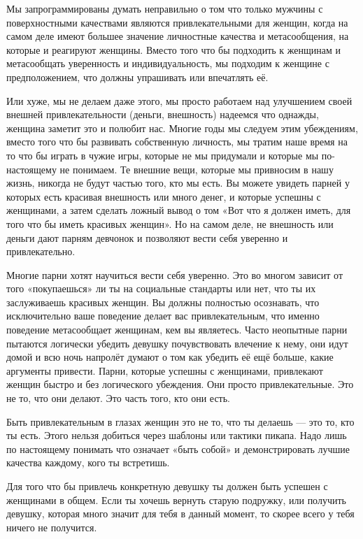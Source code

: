 Мы запрограммированы думать неправильно о том что только мужчины с поверхностными качествами являются привлекательными для женщин, когда на самом деле имеют большее значение личностные качества и метасообщения, на которые и реагируют женщины. Вместо того что бы подходить к женщинам и метасообщать уверенность и индивидуальность, мы подходим к женщине с предположением, что должны упрашивать или впечатлять её.

Или хуже, мы не делаем даже этого, мы просто работаем над улучшением своей внешней привлекательности (деньги, внешность) надеемся что однажды, женщина заметит это и полюбит нас. Многие годы мы следуем этим убеждениям, вместо того что бы развивать собственную личность, мы тратим наше время на то что бы играть в чужие игры, которые не мы придумали и которые мы по-настоящему не понимаем. Те внешние вещи, которые мы привносим в нашу жизнь, никогда не будут частью того, кто мы есть. Вы можете увидеть парней у которых есть красивая внешность или много денег, и которые успешны с женщинами, а затем сделать ложный вывод о том «Вот что я должен иметь, для того что бы иметь красивых женщин». Но на самом деле, не внешность или деньги дают парням девчонок и позволяют вести себя уверенно и привлекательно.

Многие парни хотят научиться вести себя уверенно. Это во многом зависит от того «покупаешься» ли ты на социальные стандарты или нет, что ты их заслуживаешь красивых женщин. Вы должны полностью осознавать, что исключительно ваше поведение делает вас привлекательным, что именно поведение метасообщает женщинам, кем вы являетесь. Часто неопытные парни пытаются логически убедить девушку почувствовать влечение к нему, они идут домой и всю ночь напролёт думают о том как убедить её ещё больше, какие аргументы привести. Парни, которые успешны с женщинами, привлекают женщин быстро и без логического убеждения. Они просто привлекательные. Это не то, что они делают. Это часть того, кто они есть.

\RULE  Быть привлекательным в глазах женщин это не то, что ты делаешь --- это то, кто ты есть. Этого нельзя добиться через шаблоны или тактики пикапа. Надо лишь по настоящему понимать что означает «быть собой» и демонстрировать лучшие качества каждому, кого ты встретишь.

\RULE  Для того что бы привлечь конкретную девушку ты должен быть успешен с женщинами в общем. Если ты хочешь вернуть старую подружку, или получить девушку, которая много значит для тебя в данный момент, то скорее всего у тебя ничего не получится.

